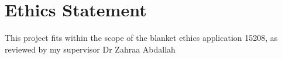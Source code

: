 \documentclass[ %
                    author={Rzan Alkabier},
                    supervisor={Dr. Zahraa Abdallah},
                    degree={MSc},
                     title={Denoising Extracellular Recording for Spike Detection and Classification on Single Channels},
                    subtitle={Does denoising improve detection and classification performance?},
                      type={},
                      year={2026}]{dissertation}
\begin{document}




\maketitle


\frontmatter


\makedecl


\tableofcontents
\listoffigures
\listoftables


\chapter*{Ethics Statement}
\noindent
This project fits within the scope of the blanket ethics application 15208, as reviewed by my supervisor Dr Zahraa Abdallah
\end{document}
